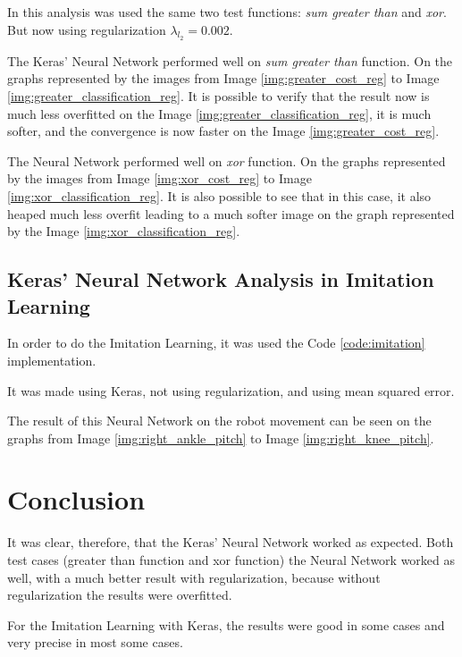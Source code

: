 \documentclass[journal]{IEEEtran}
\begin{document}
In this analysis was used the same two test functions: \textit{sum greater than} and \textit{xor}. But now using regularization $\lambda_{l_2} = 0.002$.

The Keras' Neural Network performed well on \textit{sum greater than} function. On the graphs represented by the images from Image \ref{img:greater_cost_reg} to Image \ref{img:greater_classification_reg}. It is possible to verify that the result now is much less overfitted on the Image \ref{img:greater_classification_reg}, it is much softer, and the convergence is now faster on the Image \ref{img:greater_cost_reg}.



The Neural Network performed well on \textit{xor} function. On the graphs represented by the images from Image \ref{img:xor_cost_reg} to Image \ref{img:xor_classification_reg}. It is also possible to see that in this case, it also heaped much less overfit leading to a much softer image on the graph represented by the Image \ref{img:xor_classification_reg}.


\subsection{Keras' Neural Network Analysis in Imitation Learning}

In order to do the Imitation Learning, it was used the Code \ref{code:imitation} implementation.

It was made using Keras, not using regularization, and using mean squared error.

The result of this Neural Network on the robot movement can be seen on the graphs from Image \ref{img:right_ankle_pitch} to Image \ref{img:right_knee_pitch}.



\section {Conclusion}

It was clear, therefore, that the Keras' Neural Network worked as expected. Both test cases (greater than function and xor function) the Neural Network worked as well, with a much better result with regularization, because without regularization the results were overfitted.

For the Imitation Learning with Keras, the results were good in some cases and very precise in most some cases.

\vfill
\end{document}
